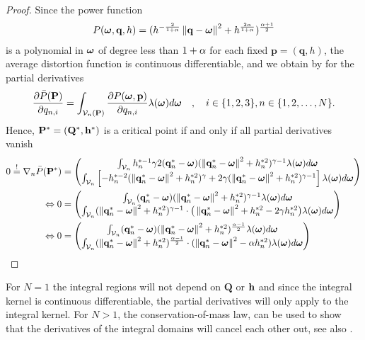 \documentclass[12pt,onecolumn,journal,draftclsnofoot,letterpaper]{IEEEtran}
\newif\ifarxiv\arxivfalse
\newenvironment{remark}{\par\vspace{1.5ex}\noindent{\em Remark\/}.}{\par\vspace{1.5ex}}
\renewcommand{\vq}{\mathbf p}
\renewcommand{\vp}{\mathbf q}
\renewcommand{\vQ}{\mathbf P}
\renewcommand{\vP}{\mathbf Q}
\newcommand{\df}{\ensuremath{\lam}}         %
\newcommand{\Pbar}{\ensuremath{\bar{P}}}         %
\newcommand{\Vor}{\ensuremath{\mathcal{V}}}         %
\begin{document}
\begin{proof}
Since the power function 
%
\begin{align}
  P(\vome,\vp,h)= (h^{-\frac{2}{1+\alp}}\Norm{\vp-\vome}^2 + h^{\frac{2\alp}{1+\alp}})^{\frac{\alp+1}{2}}
\end{align}  
%
is a polynomial in $\boldsymbol{ \omega}$ of degree less than $1+\alpha$ for each fixed $\vq=(\vp,h)$, the average distortion function is continuous
differentiable, and we obtain by \cite[Thm.1]{WJ18} for the partial derivatives 
%
\begin{align}
  \frac{\partial \Pbar(\vQ)}{\partial q_{n,i}} = \int_{\Vor_n(\vQ)} \frac{\partial P(\vome,\vq)}{\partial q_{n,i}}
  \df(\vome)d\vome\quad,\quad i\in\{1,2,3\},n\in\{1,2,\dots,N\}.
\end{align}
%
Hence, $\vQ^*=(\vP^*,\vh^*)$ is a critical point if and only if all partial derivatives vanish 
%
\begin{align}
 0\overset{!}{=} \nabla_n \Pbar(\vQ^*) &= \begin{pmatrix} 
   \int_{\Vor_n} h_n^{*-1} \gam 2 (\vp^*_{n}-\vome)  (\Norm{\vp_n^*-\vome}^2 +h_n^{*2})^{\gam-1}  \df(\vome)d \vome\\
   \int_{\Vor_n} \left[-h_n^{*-2}(\Norm{\vp^*_n-\vome}^2 + h_n^{*2})^{\gam} + 2\gam (\Norm{\vp_n^*-\vome}^2 +h_n^{*2})^{\gam-1}\right]
    \df(\vome)d \vome
  \end{pmatrix} \notag\\
\LRA 0&= \begin{pmatrix}
  \int_{\Vor_n} (\vp^*_{n}-\vome) (\Norm{\vp^*_n-\vome}^2 +h_n^{*2})^{\gam-1} \df(\vome)d \vome\\
  \int_{\Vor_n} (\Norm{\vp^*_n-\vome}^2 +h_n^{*2})^{\gam-1}\cdot \big(\Norm{\vp^*_n-\vome}^2+h_n^{*2} - 2\gam h_n^{*2} \big)
  \df(\vome)d \vome
 \end{pmatrix}\notag\\
 \LRA 0&= \begin{pmatrix}
   \int_{\Vor_n} (\vp_{n}^*-\vome) (\Norm{\vp^*_n-\vome}^2 +h_n^{*2})^{\frac{\alp-1}{2}} \df(\vome)d \vome\\
   \int_{\Vor_n} (\Norm{\vp_n^*-\vome}^2 +h_n^{*2})^{\frac{\alp-1}{2}}\cdot (\Norm{\vp_n^*-\vome}^2 - \alp h_n^{*2} )
   \df(\vome)d \vome
  \end{pmatrix}\label{eq:graddph}
\end{align}
%
\end{proof}
%
\fi
For $N=1$ the integral regions will not depend on $\vP$ or ${\mathbf h}$ and since the integral kernel is continuous differentiable, the
partial derivatives will only apply to the integral kernel. For $N>1$, the conservation-of-mass law, can be used to show
that the derivatives of the integral domains will cancel each other out, see also \cite{CMB05}. 
%
\ifarxiv
\begin{remark}
  The shape of the regions depend on the parameters, which if different for each quantization point (heterogeneous),
  generate spherical and not polyhedral regions. We will show later, that homogeneous parameter selection with polyhedral
  regions will be the optimal regions for $d=1$. 
\end{remark}
\fi
\end{document}
